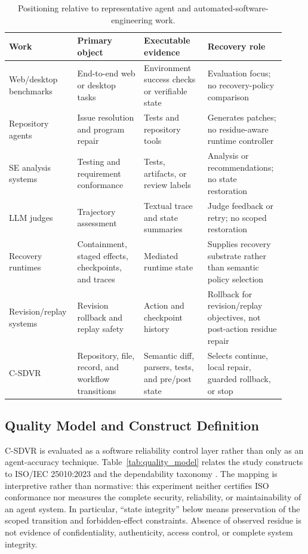 \documentclass[pdflatex,sn-apa]{sn-jnl}
\begin{document}
\begin{table}[htbp]
\centering
\caption{Positioning relative to representative agent and automated-software-engineering work.}
\label{tab:related_compare}
\scriptsize
\setlength{\tabcolsep}{3.0pt}
\begin{tabular}{p{0.20\linewidth}p{0.23\linewidth}p{0.22\linewidth}p{0.27\linewidth}}
\toprule
Work & Primary object & Executable evidence & Recovery role \\
\midrule
Web/desktop benchmarks & End-to-end web or desktop tasks & Environment success checks or verifiable state & Evaluation focus; no recovery-policy comparison \\
Repository agents & Issue resolution and program repair & Tests and repository tools & Generates patches; no residue-aware runtime controller \\
SE analysis systems & Testing and requirement conformance & Tests, artifacts, or review labels & Analysis or recommendations; no state restoration \\
LLM judges & Trajectory assessment & Textual trace and state summaries & Judge feedback or retry; no scoped restoration \\
Recovery runtimes & Containment, staged effects, checkpoints, and traces & Mediated runtime state & Supplies recovery substrate rather than semantic policy selection \\
Revision/replay systems & Revision rollback and replay safety & Action and checkpoint history & Rollback for revision/replay objectives, not post-action residue repair \\
C-SDVR & Repository, file, record, and workflow transitions & Semantic diff, parsers, tests, and pre/post state & Selects continue, local repair, guarded rollback, or stop \\
\bottomrule
\end{tabular}
\end{table}

\subsection{Quality Model and Construct Definition}

C-SDVR is evaluated as a software reliability control layer rather than only as an agent-accuracy technique. Table~\ref{tab:quality_model} relates the study constructs to ISO/IEC 25010:2023 and the dependability taxonomy \cite{iso25010_2023,avizienis2004dependability}. The mapping is interpretive rather than normative: this experiment neither certifies ISO conformance nor measures the complete security, reliability, or maintainability of an agent system. In particular, ``state integrity'' below means preservation of the scoped transition and forbidden-effect constraints. Absence of observed residue is not evidence of confidentiality, authenticity, access control, or complete system integrity.
\end{document}
